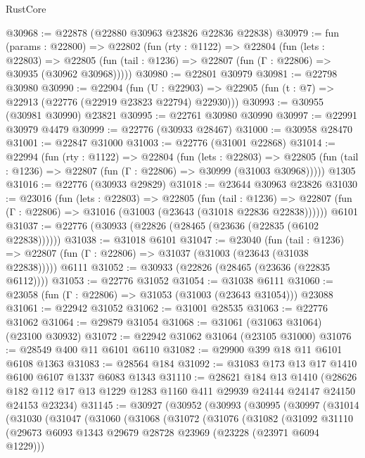 \begin{lexlean}{RustCore}
\begin{coremodule}
@30968 := @22878 (@22880 @30963 @23826 @22836 @22838)
@30979 := fun (params : @22800) =>
  @22802
    (fun (rty : @1122) =>
    @22804
      (fun (lets : @22803) =>
      @22805 (fun (tail : @1236) => @22807 (fun (Γ : @22806) => @30935 (@30962 @30968)))))
@30980 := @22801 @30979
@30981 := @22798 @30980
@30990 := @22904
    (fun (U : @22903) => @22905 (fun (t : @7) => @22913 (@22776 (@22919 @23823 @22794) @22930)))
@30993 := @30955 (@30981 @30990) @23821
@30995 := @22761 @30980 @30990
@30997 := @22991 @30979 @4479
@30999 := @22776 (@30933 @28467)
@31000 := @30958 @28470
@31001 := @22847 @31000
@31003 := @22776 (@31001 @22868)
@31014 := @22994
    (fun (rty : @1122) =>
    @22804
      (fun (lets : @22803) =>
      @22805 (fun (tail : @1236) => @22807 (fun (Γ : @22806) => @30999 (@31003 @30968)))))
    @1305
@31016 := @22776 (@30933 @29829)
@31018 := @23644 @30963 @23826
@31030 := @23016
    (fun (lets : @22803) =>
    @22805
      (fun (tail : @1236) =>
      @22807 (fun (Γ : @22806) => @31016 (@31003 (@23643 (@31018 @22836 @22838))))))
    @6101
@31037 := @22776 (@30933 (@22826 (@28465 (@23636 (@22835 (@6102 @22838))))))
@31038 := @31018 @6101
@31047 := @23040
    (fun (tail : @1236) => @22807 (fun (Γ : @22806) => @31037 (@31003 (@23643 (@31038 @22838)))))
    @6111
@31052 := @30933 (@22826 (@28465 (@23636 (@22835 @6112))))
@31053 := @22776 @31052
@31054 := @31038 @6111
@31060 := @23058 (fun (Γ : @22806) => @31053 (@31003 (@23643 @31054))) @23088
@31061 := @22942 @31052
@31062 := @31001 @28535
@31063 := @22776 @31062
@31064 := @29879 @31054
@31068 := @31061 (@31063 @31064) (@23100 @30932)
@31072 := @22942 @31062 @31064 (@23105 @31000)
@31076 := @28549 @400 @11 @6101 @6110
@31082 := @29900 @399 @18 @11 @6101 @6108 @1363
@31083 := @28564 @184
@31092 := @31083 @173 @13 @17 @1410 @6100 @6107 @1337 @6083 @1343
@31110 := @28621
    @184
    @13
    @1410
    (@28626 @182 @112 @17 @13 @1229 @1283 @1160 @411 @29939 @24144 @24147 @24150 @24153 @23234)
@31145 := @30927
    (@30952
      (@30993
        (@30995
          (@30997
            (@31014
              (@31030
                (@31047
                  (@31060
                    (@31068
                      (@31072
                        (@31076
                          (@31082
                            (@31092
                              @31110
                              (@29673
                                @6093
                                @1343
                                @29679
                                @28728
                                @23969
                                (@23228 (@23971 @6094 @1229)))

\end{coremodule}
\end{lexlean}

